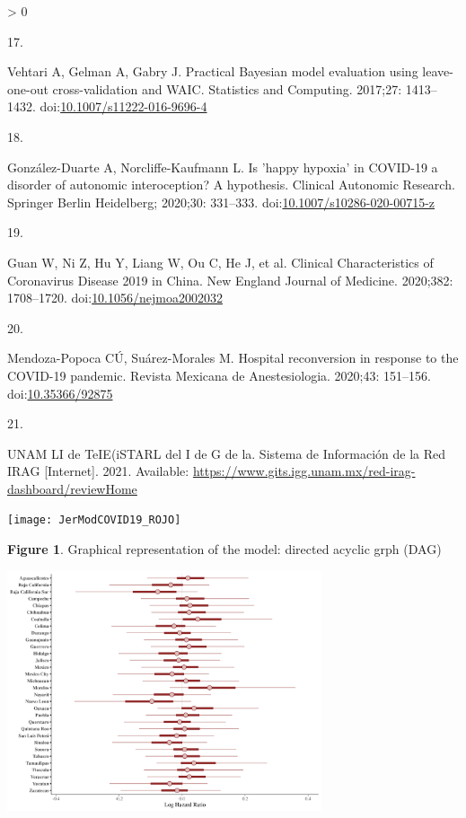 \documentclass[10pt,letterpaper]{article}
\newlength{\csllabelwidth}
\newlength{\cslhangindent}
\newenvironment{CSLReferences}[2] %
 {%
  \setlength{\parindent}{0pt}
  \ifodd #1 \everypar{\setlength{\hangindent}{\cslhangindent}}\ignorespaces\fi
  \ifnum #2 > 0
  \setlength{\parskip}{#2\baselineskip}
  \fi
 }%
 {}
\newcommand{\CSLLeftMargin}[1]{\parbox[t]{\csllabelwidth}{#1}}
\newcommand{\CSLRightInline}[1]{\parbox[t]{\linewidth - \csllabelwidth}{#1}\break}
\begin{document}
\begin{CSLReferences}{0}{0}
\leavevmode\hypertarget{ref-Vehtari2017}{}%
\CSLLeftMargin{17. }
\CSLRightInline{Vehtari A, Gelman A, Gabry J. {Practical Bayesian model
evaluation using leave-one-out cross-validation and WAIC}. Statistics
and Computing. 2017;27: 1413--1432.
doi:\href{https://doi.org/10.1007/s11222-016-9696-4}{10.1007/s11222-016-9696-4}}

\leavevmode\hypertarget{ref-Gonzalez-Duarte2020}{}%
\CSLLeftMargin{18. }
\CSLRightInline{González-Duarte A, Norcliffe-Kaufmann L. {Is 'happy
hypoxia' in COVID-19 a disorder of autonomic interoception? A
hypothesis}. Clinical Autonomic Research. Springer Berlin Heidelberg;
2020;30: 331--333.
doi:\href{https://doi.org/10.1007/s10286-020-00715-z}{10.1007/s10286-020-00715-z}}

\leavevmode\hypertarget{ref-Guan2020}{}%
\CSLLeftMargin{19. }
\CSLRightInline{Guan W, Ni Z, Hu Y, Liang W, Ou C, He J, et al.
{Clinical Characteristics of Coronavirus Disease 2019 in China}. New
England Journal of Medicine. 2020;382: 1708--1720.
doi:\href{https://doi.org/10.1056/nejmoa2002032}{10.1056/nejmoa2002032}}

\leavevmode\hypertarget{ref-Mendoza-Popoca2020}{}%
\CSLLeftMargin{20. }
\CSLRightInline{Mendoza-Popoca CÚ, Suárez-Morales M. {Hospital
reconversion in response to the COVID-19 pandemic}. Revista Mexicana de
Anestesiologia. 2020;43: 151--156.
doi:\href{https://doi.org/10.35366/92875}{10.35366/92875}}

\leavevmode\hypertarget{ref-UNAM2021}{}%
\CSLLeftMargin{21. }
\CSLRightInline{UNAM LI de TeIE(iSTARL del I de G de la. {Sistema de
Informaci{ó}n de la Red IRAG} {[}Internet{]}. 2021. Available:
\url{https://www.gits.igg.unam.mx/red-irag-dashboard/reviewHome}}

\end{CSLReferences}

\newpage

\begin{center}\texttt{[image: JerModCOVID19\_ROJO]} \end{center}

\textbf{Figure 1}. Graphical representation of the model: directed
acyclic grph (DAG)

\begin{center}\includegraphics[width=350px]{../CC2/jer2modi/mu_l_intervalsjer2modi} \end{center}
\end{document}
